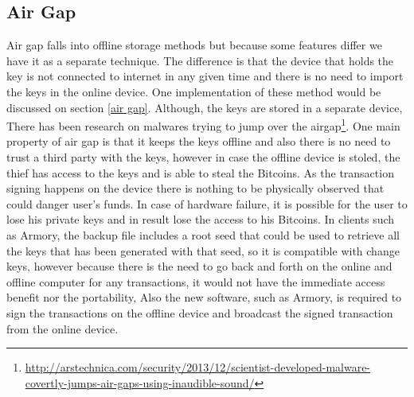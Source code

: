 \subsection{Air Gap}
Air gap falls into offline storage methods but because some features differ we have it as a separate technique. The difference is that the device that holds the key is not connected to internet in any given time and there is no need to import the keys in the online device. One implementation of these method would be discussed on section \ref{air gap}. 
Although, the keys are stored in a separate device, There has been research on malwares trying to jump over the airgap\footnote{\url{http://arstechnica.com/security/2013/12/scientist-developed-malware-covertly-jumps-air-gaps-using-inaudible-sound/}}. One main property of air gap is that it keeps the keys offline and also there is no need to trust a third party with the keys, however in case the offline device is stoled, the thief has access to the keys and is able to steal the Bitcoins. %
As the transaction signing happens on the device there is nothing to be physically observed that could danger user's funds. In case of hardware failure, it is possible for the user to lose his private keys and in result lose the access to his Bitcoins. %
In clients such as Armory, the backup file includes a root seed that could be used to retrieve all the keys that has been generated with that seed, so it is compatible with change keys, however because there is the need to go back and forth on the online and offline computer for any transactions, it would not have the immediate access benefit nor the portability, Also the new software, such as Armory, is required to sign the transactions on the offline device and broadcast the signed transaction from the online device.

